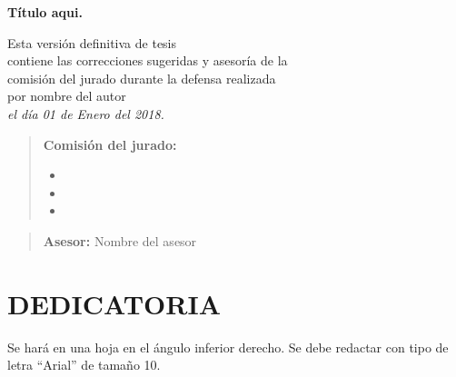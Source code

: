 \documentclass[12pt,oneside,a4paper]{book}
\begin{document}

\newpage
\thispagestyle{empty}
  \begin{center}
     \vspace*{2.3 cm}
        \textbf{\Large{Título aqui.}}\\
        \vspace*{2 cm}
    \end{center}

    \vskip 2cm

   \begin{flushright}
          Esta versión definitiva de tesis\\
         contiene las correcciones sugeridas y asesoría de la \\
          comisión del jurado durante la defensa realizada\\
          por nombre del autor\\
          \textit{el día 01 de Enero del 2018.} 
    \vskip 1cm

    \end{flushright}
    \vskip 4.2cm

    \begin{quote}
    \noindent \textbf{Comisión del jurado:}
    
    \begin{itemize}
		\item  
		\item 
		\item
    \end{itemize} 
    \end{quote}
    \begin{quote}
    	\hspace{8cm}\textbf{Asesor:} \large{Nombre del asesor}
    \end{quote}
\pagebreak
{}     %


\chapter*{DEDICATORIA}

Se hará en una hoja en el ángulo inferior derecho. Se debe redactar con tipo de letra “Arial” de tamaño 10.
\end{document}
